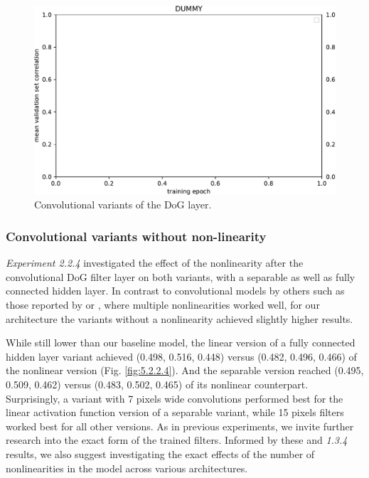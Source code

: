 \begin{figure}[H]
    \centering
    \includegraphics[width=1\textwidth]{../figures/05_dummy}
    \caption[Experiment 2.2.3]{Convolutional variants of the DoG layer.}
    \label{fig:5.2.2.3}
\end{figure}

\subsubsection{Convolutional variants without non-linearity}

\textit{Experiment 2.2.4} investigated the effect of the nonlinearity after the convolutional DoG filter layer on both variants, with a separable as well as fully connected hidden layer. In contrast to convolutional models by others such as those reported by \cite{klidnt} or \cite{ecker}, where multiple nonlinearities worked well, for our architecture the variants without a nonlinearity achieved slightly higher results.

While still lower than our baseline model, the linear version of a fully connected hidden layer variant achieved (0.498, 0.516, 0.448) versus (0.482, 0.496, 0.466) of the nonlinear version (Fig. \ref{fig:5.2.2.4}). And the separable version reached (0.495, 0.509, 0.462) versus (0.483, 0.502, 0.465) of its nonlinear counterpart. Surprisingly, a variant with 7 pixels wide convolutions performed best for the linear activation function version of a separable variant, while 15 pixels filters worked best for all other versions. As in previous experiments, we invite further research into the exact form of the trained filters. Informed by these and \textit{1.3.4} results, we also suggest investigating the exact effects of the number of nonlinearities in the model across various architectures.


